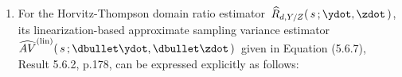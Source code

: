 \begin{lemma}
\begin{enumerate}
\begin{eqnarray*}
    \\
    & = &
        \cdots
    \;\; = \;\;
        \dfrac{
            1
            }{
            \overset{{\color{white}.}}{
                T_{d,z}^{\,2}
                }
            }
        \left\{\,
            \begin{array}{l}
                V^{\textnormal{(HT)}}(\,\dbullet\ydot\,)
                \\
                \; \overset{{\color{white}\textnormal{\Large$1$}}}{-} \;
                2\cdot\!R_{d,Y/Z}
                \cdot
                \underset{i \in U}{\sum}\;
                \underset{k \in U}{\sum}
                \left(\pi_{ik} \overset{{\color{white}.}}{-} \pi_{i}\pi_{k}\right)
                \dfrac{d_{i}y_{i}}{\pi_{i}}
                \,
                \dfrac{d_{k}y_{k}}{\pi_{k}}
                \\
                \; \overset{{\color{white}\textnormal{\Large$1$}}}{+} \;
                R_{d,Y/Z}^{\,2}
                \cdot
                V^{\textnormal{(HT)}}(\,\dbullet\zdot\,)
                \end{array}
            \right\}
    \end{eqnarray*}
\item
    For the Horvitz-Thompson domain ratio estimator
    \,$\widehat{R}_{d,Y/Z}(\,s\,;\ydot,\zdot\,)$,\,
    its {\color{red}linearization-based approximate sampling variance estimator} 
    \,$\widehat{AV}^{\textnormal{(lin)}}(\,s\,;\dbullet\ydot,\dbullet\zdot\,)$\,
    given in Equation (5.6.7), Result 5.6.2, p.178, \cite{Sarndal1992}
    can be expressed explicitly as follows:

\end{enumerate}
\end{lemma}

